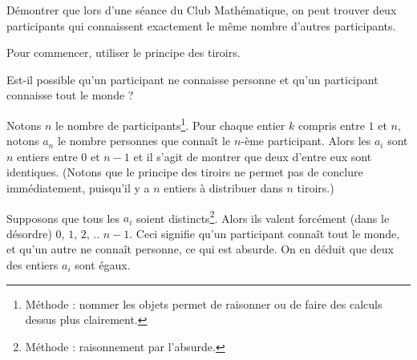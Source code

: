 



\begin{exo}
Démontrer que lors d'une séance du Club Mathématique, on peut trouver deux participants qui connaissent exactement le même nombre d'autres participants.
\begin{hint}
Pour commencer, utiliser le principe des tiroirs.
\end{hint}
\begin{hint2}
Est-il possible qu'un participant ne connaisse personne et qu'un participant connaisse tout le monde ?
\end{hint2}
\begin{sol}
Notons $n$ le nombre de participants\footnote{Méthode : nommer les objets permet de raisonner ou de faire des calculs dessus plus clairement.}. Pour chaque entier $k$ compris entre $1$ et $n$, notons $a_n$ le nombre personnes que connaît le $n$-ème participant. Alors les $a_i$ sont $n$ entiers entre $0$ et $n-1$ et il s'agit de montrer que deux d'entre eux sont identiques. (Notons que le principe des tiroirs ne permet pas de conclure immédiatement, puisqu'il y a $n$ entiers à distribuer dans $n$ tiroirs.)

Supposons que tous les $a_i$ soient distincts\footnote{Méthode : raisonnement par l'absurde.}. Alors ils valent forcément (dans le désordre) $0$, $1$, $2$, .. $n-1$. Ceci signifie qu'un participant connaît tout le monde, et qu'un autre ne connaît personne, ce qui est absurde. On en déduit que deux des entiers $a_i$ sont égaux.
\end{sol}
\end{exo}


